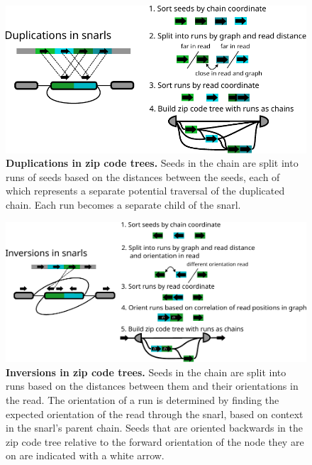 \documentclass[11pt]{ucscthesis}
\begin{document}
\begin{figure}
    \centering
    \includegraphics[width=\columnwidth]{zipcode_snarl_duplication.pdf}
    \caption[Duplications in zip code trees]{\textbf{Duplications in zip code trees.} Seeds in the chain are split into runs of seeds based on the distances between the seeds, each of which represents a separate potential traversal of the duplicated chain. Each run becomes a separate child of the snarl.}
    \label{fig:ziptree-duplication}
\end{figure}

\begin{figure}
    \centering
    \includegraphics[width=\columnwidth]{zipcode_snarl_inversion.pdf}
    \caption[Inversions in zip code trees]{\textbf{Inversions in zip code trees.} Seeds in the chain are split into runs based on the distances between them and their orientations in the read. The orientation of a run is determined by finding the expected orientation of the read through the snarl, based on context in the snarl's parent chain. Seeds that are oriented backwards in the zip code tree relative to the forward orientation of the node they are on are indicated with a white arrow.}
    \label{fig:ziptree-inversion}
\end{figure}
\end{document}
